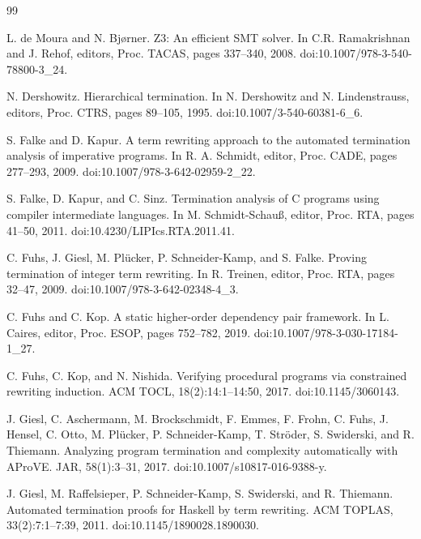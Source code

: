 \documentclass[10pt,a4paper]{amsart}
\begin{document}
\begin{thebibliography}{99}
\par\noindent  [8]  L. de Moura and N. Bjørner.  Z3: An efficient SMT solver.  In C.R. Ramakrishnan and J. Rehof, editors, Proc. TACAS, pages 337–340, 2008.  doi:10.1007/978-3-540-78800-3\_24.  
 
\par\noindent  [9]  N. Dershowitz.  Hierarchical termination.  In N. Dershowitz and N. Lindenstrauss, editors, Proc. CTRS, pages 89–105, 1995.  doi:10.1007/3-540-60381-6\_6.  
 
\par\noindent  [10]  S. Falke and D. Kapur.  A term rewriting approach to the automated termination analysis of imperative programs.  In R. A. Schmidt, editor, Proc. CADE, pages 277–293, 2009.  doi:10.1007/978-3-642-02959-2\_22.  
 
\par\noindent  [11]  S. Falke, D. Kapur, and C. Sinz.  Termination analysis of C programs using compiler intermediate languages.  In M. Schmidt-Schauß, editor, Proc. RTA, pages 41–50, 2011.  doi:10.4230/LIPIcs.RTA.2011.41.  
 
\par\noindent  [12]  C. Fuhs, J. Giesl, M. Plücker, P. Schneider-Kamp, and S. Falke.  Proving termination of integer term rewriting.  In R. Treinen, editor, Proc. RTA, pages 32–47, 2009.  doi:10.1007/978-3-642-02348-4\_3.  
 
\par\noindent  [13]  C. Fuhs and C. Kop.  A static higher-order dependency pair framework.  In L. Caires, editor, Proc. ESOP, pages 752–782, 2019.  doi:10.1007/978-3-030-17184-1\_27.  
 
\par\noindent  [14]  C. Fuhs, C. Kop, and N. Nishida.  Verifying procedural programs via constrained rewriting induction.  ACM TOCL, 18(2):14:1–14:50, 2017.  doi:10.1145/3060143.  
 
\par\noindent  [15]  J. Giesl, C. Aschermann, M. Brockschmidt, F. Emmes, F. Frohn, C. Fuhs, J. Hensel, C. Otto, M. Plücker, P. Schneider-Kamp, T. Ströder, S. Swiderski, and R. Thiemann.  Analyzing program termination and complexity automatically with AProVE.  JAR, 58(1):3–31, 2017.  doi:10.1007/s10817-016-9388-y.  
 
\par\noindent  [16]  J. Giesl, M. Raffelsieper, P. Schneider-Kamp, S. Swiderski, and R. Thiemann.  Automated termination proofs for Haskell by term rewriting.  ACM TOPLAS, 33(2):7:1–7:39, 2011.  doi:10.1145/1890028.1890030.  
 

\end{thebibliography}
\end{document}
